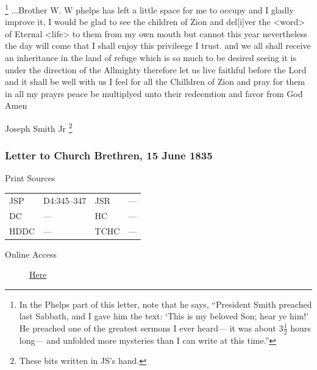 				\footnote{%
					In the Phelps part of this letter, note that he says, ``President Smith preached last Sabbath, and I gave him the text: `This is my beloved Son; hear ye him!' He preached one of the greatest sermons I ever heard--- it was about 3$\frac{1}{2}$ hours long--- and unfolded more mysteries than I can write at this time.''
					}%
				...Brother W. W phelps has left a little space for me to occupy and I gladly improve it, I would be glad to see the children of Zion and del[i]ver the <word> of Eternal <life> to them from my own mouth but cannot this year nevertheless the day will come that I shall enjoy this privileege I trust. and we all shall receive an inheritance in the land of refuge which is so much to be desired seeing it is under the direction of the Allmighty therefore let us live faithful before the Lord and it shall be well with us I feel for all the Chilldren of Zion and pray for them in all my prayrs peace be multiplyed unto their redeemtion and favor from God Amen

				\begin{tightright}
				Joseph Smith Jr%
					\footnote{%
						\label{EMS-1835-JS-1-2-JUN-1835-JS}%
						These bits written in JS's hand.
						}
				\end{tightright}
				
		\subsubsection{Letter to Church Brethren, 15 June 1835}
			\label{EMS-1835-JS-15-JUN-1835}
			
			\begin{description}
				\item[Print Sources]
			\end{description}

				\begin{tabular}{p{0.5in}p{1in}p{0.5in}p{1in}}
				JSP	 	& D4:345--347		& JSR 		& --- \\
				DC	 	& --- 				& HC 		& --- \\
				HDDC 	& ---				& TCHC 		& --- \\
				\end{tabular}
			
			\begin{description}
				\item[Online Access] \href{https://www.josephsmithpapers.org/paper-summary/letter-to-church-brethren-15-june-1835/1}{Here}
			\end{description}
			
